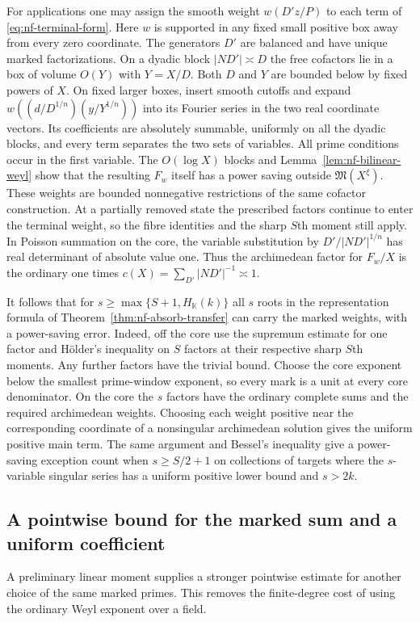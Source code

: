 \documentclass[11pt,letterpaper]{article}
\theoremstyle{definition}
\numberwithin{equation}{section}
\begin{document}
For applications one may assign the smooth weight $w(D'z/P)$ to
each term of \eqref{eq:nf-terminal-form}. Here $w$ is supported in
any fixed small positive box away from every zero coordinate.
The generators $D'$ are balanced and have unique marked
factorizations. On a dyadic block $|ND'|\asymp D$ the free cofactors
lie in a box of volume $O(Y)$ with $Y=X/D$. Both $D$ and $Y$ are
bounded below by fixed powers of $X$. On fixed larger boxes, insert
smooth cutoffs and expand $w((d/D^{1/n})(y/Y^{1/n}))$ into its
Fourier series in the two real coordinate vectors. Its coefficients
are absolutely summable, uniformly on all the dyadic blocks,
and every term separates the two sets of variables. All prime
conditions occur in the first variable. The $O(\log X)$ blocks
and Lemma~\ref{lem:nf-bilinear-weyl} show that the resulting $F_w$
itself has a power saving outside $\mathfrak M(X^\xi)$. These
weights are bounded nonnegative restrictions of the same cofactor
construction. At a partially removed state the prescribed factors
continue to enter the terminal weight, so the fibre identities and
the sharp $S$th moment still apply. In Poisson summation on the core,
the variable substitution by $D'/|ND'|^{1/n}$ has real determinant
of absolute value one. Thus the archimedean factor for $F_w/X$ is
the ordinary one times $c(X)=\sum_{D'}|ND'|^{-1}\asymp1$.

It follows that for $s\ge\max\{S+1,H_{\mathbb K}(k)\}$ all $s$
roots in the representation formula of
Theorem~\ref{thm:nf-absorb-transfer} can carry the marked weights,
with a power-saving error. Indeed, off the core use the supremum
estimate for one factor and H\"older's inequality on $S$ factors at
their respective sharp $S$th moments. Any further factors have
the trivial bound. Choose the core exponent below the smallest prime-window exponent, so every mark is a unit at every core denominator. On the core the $s$ factors have the ordinary
complete sums and the required archimedean weights. Choosing each
weight positive near the corresponding coordinate of a nonsingular
archimedean solution gives the uniform positive main term.
The same argument and Bessel's inequality give a power-saving
exception count when $s\ge S/2+1$ on collections of targets
where the $s$-variable singular series has a uniform positive
lower bound and $s>2k$.

\subsection{A pointwise bound for the marked sum and a uniform coefficient}
\label{sec:nf-self-weyl}
A preliminary linear moment supplies a stronger pointwise estimate
for another choice of the same marked primes. This removes the
finite-degree cost of using the ordinary Weyl exponent over a field.
\end{document}
